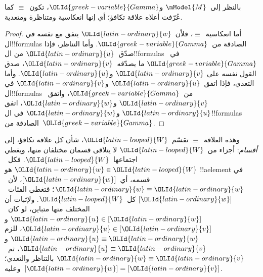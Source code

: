\documentclass[../../../include/open-logic-section]{subfiles}
\begin{document}
\begin{prop}
  بالنظر إلى~$\mModel{M}$ و$\OLId{greek-variable}{Gamma}$، تكون~$\equiv$ كما عُرّفت أعلاه
  علاقة تكافؤ؛ أي إنها انعكاسية ومتناظرة ومتعدية.
\end{prop}

\begin{proof}
  أما انعكاسية~$\equiv$، فلأن~$\OLId{latin-ordinary}{w}$ يتفق مع نفسه
  في ال!!{formula}s الصادقة من~$\OLId{greek-variable}{Gamma}$.
  وأما التناظر، فإذا صدّق~$\OLId{latin-ordinary}{u}$ من ال!!{formula}s
  في~$\OLId{greek-variable}{Gamma}$ ما يصدّقه~$\OLId{latin-ordinary}{v}$، صدق القول نفسه على
  $\OLId{latin-ordinary}{v}$ و$\OLId{latin-ordinary}{u}$. وأما التعدي، فإذا اتفق~$\OLId{latin-ordinary}{u}$ و$\OLId{latin-ordinary}{v}$
  في ال!!{formula}s من~$\OLId{greek-variable}{Gamma}$، واتفق~$\OLId{latin-ordinary}{v}$ و$\OLId{latin-ordinary}{w}$،
  اتفق $\OLId{latin-ordinary}{u}$ و$\OLId{latin-ordinary}{w}$ في ال!!{formula}s الصادقة
  من~$\OLId{greek-variable}{Gamma}$.
\end{proof}

وهذه العلاقة~$\equiv$ تقسّم~$\OLId{latin-looped}{W}$، شأن كل علاقة
تكافؤ، إلى \emph{أقسام}: أجزاء من~$\OLId{latin-looped}{W}$ لا يتلاقى
قسمان مختلفان منها، ويغطي اجتماعها~$\OLId{latin-looped}{W}$.
فكل~$\OLId{latin-ordinary}{w} \in \OLId{latin-looped}{W}$ هو !!a{element} في قسمه،
أي~$[\OLId{latin-ordinary}{w}]$، لأن~$\OLId{latin-ordinary}{w} \equiv \OLId{latin-ordinary}{w}$؛ فتغطي الفئات~$[\OLId{latin-ordinary}{w}]$
كل~$\OLId{latin-looped}{W}$. ولإثبات أن المختلف منها متباين،
لو كان~$\OLId{latin-ordinary}{u} \in [\OLId{latin-ordinary}{w}]$ و$\OLId{latin-ordinary}{u} \in [\OLId{latin-ordinary}{v}]$، للزم
$\OLId{latin-ordinary}{u} \equiv \OLId{latin-ordinary}{w}$ و$\OLId{latin-ordinary}{u} \equiv \OLId{latin-ordinary}{v}$، ثم~$\OLId{latin-ordinary}{w} \equiv \OLId{latin-ordinary}{v}$
بالتناظر والتعدي؛ وعليه~$[\OLId{latin-ordinary}{w}]=[\OLId{latin-ordinary}{v}]$.
\end{document}
